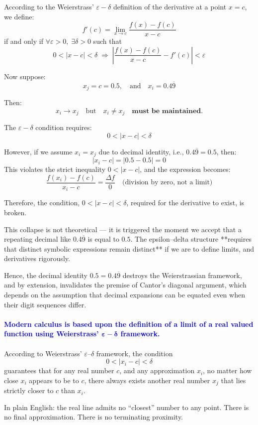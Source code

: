 \documentclass[12pt]{article}
\theoremstyle{definition} %
\numberwithin{equation}{section}
\newcommand{\boldblu}[1]			    {\textbf{\textcolor{blue}{#1}}}
\begin{document}
\begin{enumerate}
According to the Weierstrass' \(\varepsilon-\delta\) definition of the derivative at a point \(x = c\), we define:
\[
f'(c) = \lim_{x \to c} \frac{f(x) - f(c)}{x - c}
\]
if and only if \(\forall \varepsilon > 0,\; \exists \delta > 0\) such that
\[
 0 < |x - c| < \delta \; \Rightarrow \;
\left| \frac{f(x) - f(c)}{x - c} - f'(c) \right| < \varepsilon
\]

Now suppose:
\[
x_j = c = 0.5, \quad \text{and} \quad x_i = 0.4\overline{9}
\]

Then:
\[
x_i \to x_j \quad \text{but} \quad x_i \ne x_j \quad \bm{\textbf{must be maintained.}}
\]

The \(\varepsilon-\delta\) condition requires:
\[
0 < |x - c| < \delta
\]

However, if we assume \(x_i = x_j\) due to decimal identity, i.e., \(0.4\overline{9} = 0.5\), then:
\[
|x_i - c| = |0.5 - 0.5| = 0
\]
This violates the strict inequality \(0 < |x - c|\), and the expression becomes:
\[
\frac{f(x_i) - f(c)}{x_i - c} = \frac{\Delta f}{0}
\quad \text{(division by zero, not a limit)}
\]

Therefore, the condition, \( 0 < |x - c| < \delta\), required for the derivative to exist, is broken.

This collapse is not theoretical — it is triggered the moment we accept that a repeating decimal like \(0.4\overline{9}\) is equal to \(0.5\). The epsilon–delta structure **requires that distinct symbolic expressions remain distinct** if we are to define limits, and derivatives rigorously.

Hence, the decimal identity \(0.5 = 0.4\overline{9}\) destroys the Weierstrassian framework, and by extension, invalidates the premise of Cantor’s diagonal argument, which depends on the assumption that decimal expansions can be equated even when their digit sequences differ.\\
\\
\boldblu{Modern calculus is based upon the definition of a limit of a real valued function using Weierstrass’ \(\bm{\varepsilon-\delta} \) framework.}\\
\\
According to Weierstrass’ \(\varepsilon\text{--}\delta\) framework, the condition
\[
0 < |x_i - c| < \delta
\]
guarantees that for any real number \(c\), and any approximation \(x_i\), no matter how close \(x_i\) appears to be to \(c\), there always exists another real number \(x_j\) that lies strictly closer to \(c\) than \(x_i\).

In plain English: the real line admits no “closest” number to any point. There is no final approximation. There is no terminating proximity.


\end{enumerate}
\end{document}
